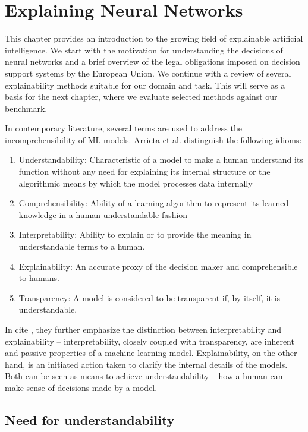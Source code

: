\chapter{Explaining Neural Networks}

This chapter provides an introduction to the growing field of explainable artificial intelligence.
We start with the motivation for understanding the decisions of neural networks and a brief overview of the legal obligations imposed on decision support systems by the European Union.
We continue with a review of several explainability methods suitable for our domain and task.
This will serve as a basis for the next chapter, where we evaluate selected methods against our benchmark.

In contemporary literature, several terms are used to address the incomprehensibility of ML models. Arrieta et al. \cite{arrieta-taxonomy} distinguish the following idioms:

\begin{enumerate}
    \item Understandability: Characteristic of a model to make a human understand its function without any need for explaining its internal structure or the algorithmic means by which the model processes data internally
    \item Comprehensibility: Ability of a learning algorithm to represent its learned knowledge in a human-understandable fashion 
    \item Interpretability: Ability to explain or to provide the meaning in understandable terms to a human.
    \item Explainability: An accurate proxy of the decision maker and comprehensible to humans.
    \item Transparency: A model is considered to be transparent if, by itself, it is understandable.
\end{enumerate}

In cite \cite{arrieta-taxonomy}, they further emphasize the distinction between interpretability and explainability -- interpretability, closely coupled with transparency, are inherent and passive properties of a machine learning model.
Explainability, on the other hand, is an initiated action taken to clarify the internal details of the models.
Both can be seen as means to achieve understandability -- how a human can make sense of decisions made by a model.


\section{Need for understandability}\label{sec:need-for-xai}

